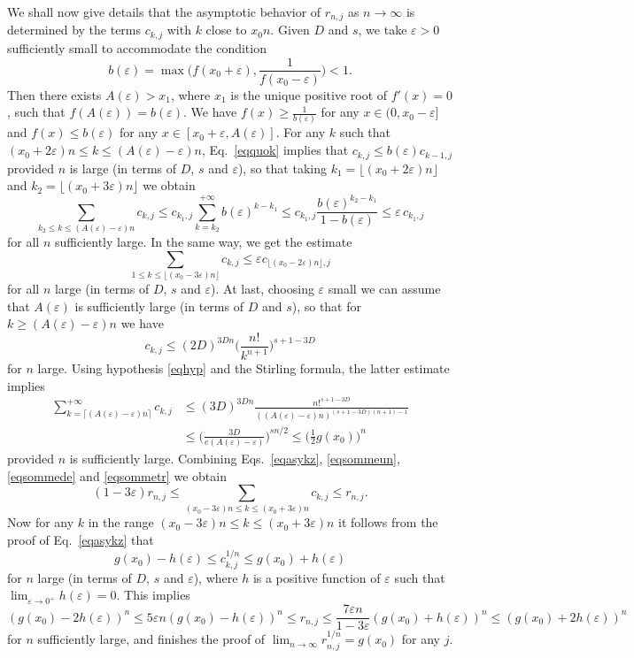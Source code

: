 \documentclass{article}
\numberwithin{equation}{section}
\theoremstyle{remark}
\newenvironment{Proof}[1][Proof]{\proof[\rm\textbf{#1}]}{\endproof}
\newcommand{\eps}{\varepsilon}
\begin{document}
\begin{Proof}
 \bigskip
We shall now give details that the asymptotic behavior of $r_{n,j}$ as $n\to\infty$ is determined by the terms $c_{k,j}$ with $k$ close to $x_0n $. Given $D$ and $s$, we take $\eps>0$ sufficiently small to accommodate the condition
$$b(\eps) = \max\Big( f(x_0+\eps), \frac1{f(x_0-\eps)}\Big)<1.$$
Then there exists $A(\eps) > x_1$, where $x_1$ is the unique positive root of $f'(x)=0$, such that $f(A(\eps))=b(\eps)$.
We have $f(x) \geq \frac1{b(\eps)}$ for any $x\in (0, x_0-\eps]$ and $f(x) \leq b(\eps) $ for any $x\in [ x_0+\eps, A(\eps)]$. For any $k$ such that $(x_0+2\eps)n \leq k\leq (A(\eps)-\eps)n$, Eq.~\eqref{eqquok} implies that $c_{k,j} \leq b(\eps) c_{k-1,j}$ provided $n$ is large (in terms of  $D$, $s$ and $\eps$), so that taking $k_1 = \lfloor (x_0+2\eps)n \rfloor$ and $k_2 = \lfloor (x_0+3\eps)n \rfloor$ we obtain
\begin{equation} \label{eqsommeun}
\sum_{k_2\leq k\leq (A(\eps)-\eps)n} c_{k,j} \leq c_{k_1,j}\sum_{k=k_2}^{+\infty} b(\eps)^{k-k_1}\leq c_{k_1,j}\frac{b(\eps)^{k_2-k_1}}{1-b(\eps)} \leq \eps \, c_{k_1,j}
\end{equation}
for all $n$ sufficiently large. In the same way, we get the estimate
\begin{equation} \label{eqsommede}
\sum_{1\leq k\leq \lfloor (x_0-3\eps)n \rfloor } c_{k,j} \leq \eps c_{ \lfloor (x_0-2\eps)n \rfloor , j}
\end{equation}
for all $n$ large (in terms of  $D$, $s$ and $\eps$).
At last, choosing $\eps$ small we can assume that $A(\eps)$ is sufficiently large (in terms of $D$ and $s$),
so that for $k \geq (A(\eps)-\eps)n$ we have
$$c_{k,j} \leq (2D)^{3Dn} \bigg( \frac{n!}{k^{n+1}}\bigg)^{ s+1 - 3D}$$
for $n$ large.
Using hypothesis \eqref{eqhyp} and the Stirling formula, the latter estimate implies
\begin{align}
\sum_{k = \lceil (A(\eps)-\eps)n\rceil} ^{+\infty} c_{k,j}
&\leq (3D)^{3Dn} \frac{n!^{ s+1 - 3D}}{((A(\eps)-\eps)n)^{(s+1-3D)(n+1)-1}} \nonumber\\
&\leq \bigg( \frac{3D}{e (A(\eps)-\eps)}\bigg)^{sn/2}
\leq \Big( \frac12 g(x_0)\Big)^n
\label{eqsommetr}
\end{align} 
provided $n$ is sufficiently large. Combining Eqs.~\eqref{eqasykz}, \eqref{eqsommeun}, \eqref{eqsommede} and \eqref{eqsommetr} we obtain
\begin{equation} \label{eqenca}
(1-3\eps) r_{n,j} \leq \sum_{ (x_0-3\eps)n \leq k \leq (x_0+3\eps)n } c_{k,j} \leq r_{n,j}.
\end{equation} 
Now for any $k$ in the range $ (x_0-3\eps)n \leq k \leq (x_0+3\eps)n $ it follows from the proof of Eq.~\eqref{eqasykz} that
$$g(x_0)-h(\eps) \leq c_{k,j}^{1/n} \leq g(x_0)+h(\eps)$$
for $n$ large (in terms of  $D$, $s$ and $\eps$), where $h$ is a positive function of $\eps$ such that $\lim_{\eps\to0^+} h(\eps) = 0$. This implies
$$(g(x_0)-2h(\eps))^n \leq 5\eps n (g(x_0)-h(\eps))^n \leq r_{n,j} \leq \frac{7\eps n}{1-3\eps} (g(x_0)+h(\eps))^n \leq (g(x_0)+2h(\eps))^n $$
for $n$ sufficiently large, and finishes the proof of $\lim_{n\to\infty} r_{n,j}^{1/n} = g(x_0)$ for any $j$.


\end{Proof}
\end{document}
